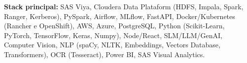 \begin{cvparagraph}
\textbf{Stack principal:} SAS Viya, Cloudera Data Plataform (HDFS, Impala, Spark, Ranger, Kerberos), PySpark, Airflow, MLflow, FastAPI, Docker/Kubernetes (Rancher e OpenShift), AWS, Azure, PostgreSQL, Python (Scikit-Learn, PyTorch, TensorFlow, Keras, Numpy), Node/React, SLM/LLM/GenAI, Computer Vision, NLP (spaCy, NLTK, Embeddings, Vectors Database, Transformers), OCR (Tesseract), Power BI, SAS Visual Analytics.

\end{cvparagraph} 